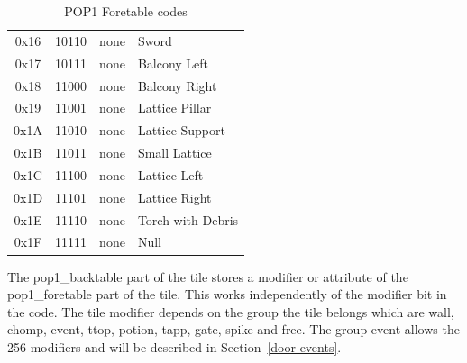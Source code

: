 \documentclass{article}
\begin{document}
\begin{table}
\begin{tabular}{cccl}
0x16 & 10110 & none  & Sword \\
0x17 & 10111 & none  & Balcony Left \\
0x18 & 11000 & none  & Balcony Right \\
0x19 & 11001 & none  & Lattice Pillar \\
0x1A & 11010 & none  & Lattice Support \\
0x1B & 11011 & none  & Small Lattice \\
0x1C & 11100 & none  & Lattice Left \\
0x1D & 11101 & none  & Lattice Right \\
0x1E & 11110 & none  & Torch with Debris \\
0x1F & 11111 & none  & Null \\
\hline
\end{tabular}
\caption{POP1 Foretable codes}
\label{palettes table}
\end{table}

 The pop1\_backtable part of the tile stores a modifier or attribute of the
 pop1\_foretable part of the tile. This works independently of the modifier
 bit in the code. The tile modifier depends on the group the tile belongs
 which are wall, chomp, event, ttop, potion, tapp, gate, spike and free.
 The group event allows the 256 modifiers and will be described in Section~\ref{door events}.
\end{document}
